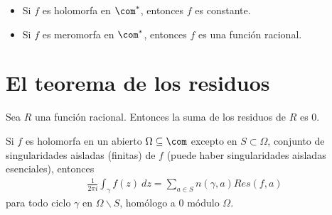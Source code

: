 \begin{teo}
\begin{itemize}
    \item Si $f$ es holomorfa en $\com^*$, entonces $f$ es constante.
    \item Si $f$ es meromorfa en $\com^*$, entonces $f$ es una función racional.
\end{itemize}
\end{teo}

\section{El teorema de los residuos}

\begin{prop}
Sea $R$ una función racional. Entonces la suma de los residuos de $R$ es $0$.
\end{prop}

\begin{teo}
Si $f$ es holomorfa en un abierto $\Omega \subseteq \com$ excepto en $S \subset \Omega$, conjunto de singularidades aisladas (finitas) de $f$ (puede haber singularidades aisladas esenciales), entonces
\begin{align*}
    \frac{1}{2\pi i}\int_{\gamma}{f(z) \ dz} = \sum_{a \in S}{n(\gamma,a)Res(f,a)}
\end{align*}
para todo ciclo $\gamma$ en $\Omega \backslash S$, homólogo a 0 módulo $\Omega$.
\end{teo}

